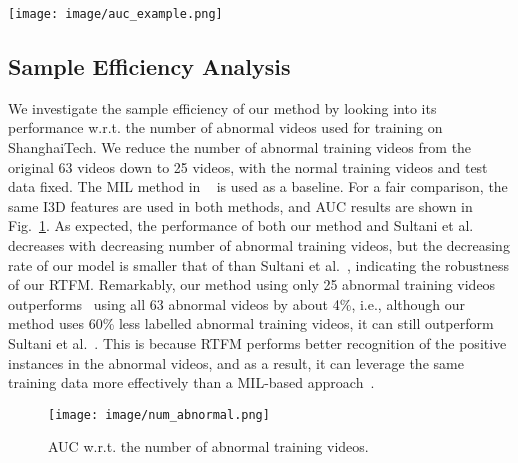 \documentclass[final]{cvpr}
\begin{document}
\begin{figure*}[h!]
\begin{center}
\texttt{[image: image/auc\_example.png]}
\end{center}
   \caption{Anomaly scores and feature magnitude values of our method on UCF-Crime (\textit{stealing079},\textit{shoplifting028}, \textit{robbery050} \textit{normal876}), and ShanghaiTech (\textit{01\_0052}, \textit{01\_0053}) test videos.
Pink areas indicate the manually labelled abnormal events. }
\label{fig:ucf_example}
\end{figure*}

\subsection{Sample Efficiency Analysis}

We investigate the sample efficiency of our method by looking into its performance w.r.t. the number of abnormal videos used for training on ShanghaiTech. We reduce the number of abnormal training videos from the original 63 videos down to 25 videos, with the normal training videos and test data fixed. The MIL method in ~\cite{sultani2018real} is used as a baseline. For a fair comparison, the same I3D features are used in both methods,  and AUC results are shown in Fig.~\ref{fig:num_abnormal}. As expected, the performance of both our method and Sultani et al.~\cite{sultani2018real} decreases with decreasing number of abnormal training videos, but the decreasing rate of our model is smaller that of than Sultani et al.~\cite{sultani2018real}, indicating the robustness of our RTFM. Remarkably, our method using only 25 abnormal training videos outperforms~\cite{sultani2018real} using all 63 abnormal videos by about 4\%, i.e., although our method uses 60\% less labelled abnormal training videos, it can still outperform Sultani et al.~\cite{sultani2018real}. This is because RTFM performs better recognition of the positive instances in the abnormal videos, and as a result, it can leverage the same training data more effectively than a MIL-based approach~\cite{sultani2018real}.


\begin{figure}[h!]
\begin{center}
\texttt{[image: image/num\_abnormal.png]}
\end{center}
   \caption{AUC w.r.t. the number of abnormal training videos. 
}
\label{fig:num_abnormal}
\end{figure}
\end{document}
